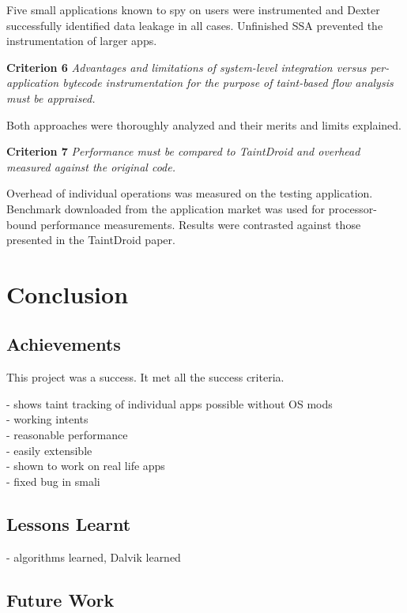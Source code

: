 \documentclass[12pt,twoside,notitlepage]{report}
\begin{document}
\begin{description}
	Five small applications known to spy on users were instrumented and Dexter successfully identified data leakage in all cases. Unfinished SSA prevented the instrumentation of larger apps.
      
	\item \textbf{Criterion 6} \emph{Advantages and limitations of system-level integration versus per-application bytecode instrumentation for the purpose of taint-based flow analysis must be appraised.}

	Both approaches were thoroughly analyzed and their merits and limits explained.

	\item \textbf{Criterion 7} \emph{Performance must be compared to TaintDroid and overhead measured against the original code.}

	Overhead of individual operations was measured on the testing application. Benchmark downloaded from the application market was used for processor-bound performance measurements. Results were contrasted against those presented in the TaintDroid paper.
\end{description}

\cleardoublepage
\chapter{Conclusion}

\section{Achievements}

This project was a success. It met all the success criteria.

- shows taint tracking of individual apps possible without OS mods \\
- working intents \\
- reasonable performance \\
- easily extensible \\
- shown to work on real life apps \\
- fixed bug in smali \\

\section{Lessons Learnt}

- algorithms learned, Dalvik learned

\section{Future Work}
\end{document}
